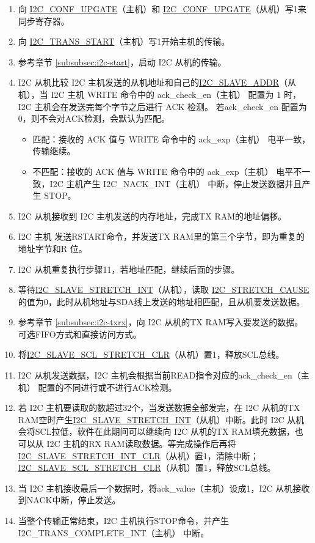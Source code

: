 \documentclass[main\_\_CN.tex]{subfiles}
\begin{document}
\begin{enumerate}
\item 向 \hyperref[fielddesc:I2CCONFUPGATE]{I2C\_CONF\_UPGATE}（主机）和 \hyperref[fielddesc:I2CCONFUPGATE]{I2C\_CONF\_UPGATE}（从机）写1来同步寄存器。
\item 向 \hyperref[fielddesc:I2CTRANSSTART]{I2C\_TRANS\_START}（主机）写1开始主机的传输。
\item 参考章节 \ref{subsubsec:i2c-start}，启动 I2C 从机的传输。


\item I2C 从机比较 I2C 主机发送的从机地址和自己的\hyperref[fielddesc:I2CSLAVEADDR]{I2C\_SLAVE\_ADDR}（从机），当 I2C 主机 WRITE 命令中的 ack\_check\_en（主机） 配置为 1 时，I2C 主机会在发送完每个字节之后进行 ACK 检测。 若ack\_check\_en 配置为 0，则不会对ACK检测，会默认为匹配。
\begin{itemize}
\item 匹配：接收的 ACK 值与 WRITE 命令中的 ack\_exp（主机） 电平一致，传输继续。
\item 不匹配：接收的 ACK 值与 WRITE 命令中的 ack\_exp（主机） 电平不一致，I2C 主机产生 I2C\_NACK\_INT（主机） 中断，停止发送数据并且产生 STOP。
\end{itemize}
\item I2C 从机接收到 I2C 主机发送的内存地址，完成TX RAM的地址偏移。
\item I2C 主机 发送RSTART命令，并发送TX RAM里的第三个字节，即为重复的地址字节和R 位。
\item I2C 从机重复执行步骤11，若地址匹配，继续后面的步骤。

\item 等待\hyperref[int:i2c-slave-stretch]{I2C\_SLAVE\_STRETCH\_INT}（从机），读取 \hyperref[fielddesc:I2CSTRETCHCAUSE]{I2C\_STRETCH\_CAUSE} 的值为0，此时从机地址与SDA线上发送的地址相匹配，且从机要发送数据。

\item 参考章节 \ref{subsubsec:i2c-txrx}，向 I2C 从机的TX RAM写入要发送的数据。可选FIFO方式和直接访问方式。
\item 将\hyperref[fielddesc:I2CSLAVESCLSTRETCHCLR]{I2C\_SLAVE\_SCL\_STRETCH\_CLR}（从机）置1，释放SCL总线。


\item I2C 从机发送数据，I2C 主机会根据当前READ指令对应的ack\_check\_en（主机） 配置的不同进行或不进行ACK检测。
\item 若 I2C 主机要读取的数超过32个，当发送数据全部发完，在 I2C 从机的TX RAM空时产生\hyperref[int:i2c-slave-stretch]{I2C\_SLAVE\_STRETCH\_INT}（从机）中断。此时 I2C 从机会将SCL拉低，软件在此期间可以继续向 I2C 从机的TX RAM填充数据，也可以从 I2C 主机的RX RAM读取数据。等完成操作后再将\hyperref[fielddesc:I2CSLAVESTRETCHINTCLR]{I2C\_SLAVE\_STRETCH\_INT\_CLR}（从机）置1，清除中断；\hyperref[fielddesc:I2CSLAVESCLSTRETCHCLR]{I2C\_SLAVE\_SCL\_STRETCH\_CLR}（从机）置1，释放SCL总线。

\item 当 I2C 主机接收最后一个数据时，将ack\_value（主机）设成1，I2C 从机接收到NACK中断，停止发送。

\item 当整个传输正常结束，I2C 主机执行STOP命令，并产生 I2C\_TRANS\_COMPLETE\_INT（主机） 中断。
\end{enumerate}
\end{document}
